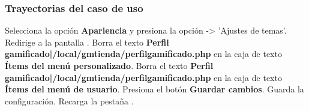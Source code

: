 \subsubsection{Trayectorias del caso de uso}

\begin{UCtrayectoria}%
%
    \Actor Selecciona la opción \textbf{Apariencia}  y presiona la opción -> 'Ajustes de temas'.
    \Sistema Redirige a la pantalla .
    \Actor Borra el texto \textbf{Perfil gamificado|/local/gmtienda/perfilgamificado.php} en la caja de texto \textbf{Ítems del menú personalizado}.
    \Actor Borra el texto \textbf{Perfil gamificado|/local/gmtienda/perfilgamificado.php} en la caja de texto \textbf{Ítems del menú de usuario}.
    \Actor Presiona el botón \textbf{Guardar cambios}.
    \Sistema Guarda la configuración.
    \Sistema Recarga la pestaña  .
    
\end{UCtrayectoria}
